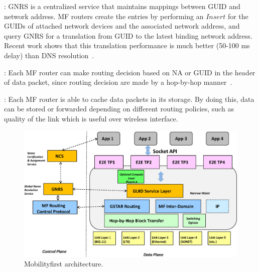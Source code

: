 \vspace{1mm}: GNRS is a centralized service that maintains mappings between GUID and network address. MF routers create the entries by performing an $Insert$ for the GUIDs of attached network devices and the associated network address, and query GNRS for a translation from GUID to the latest binding network address. Recent work shows that this translation performance is much better (50-100 ms delay) than DNS resolution~\cite{vu2012dmap}.

\vspace{1mm}: Each MF router can make routing decision based on NA or GUID in the header of data packet, since routing decision are made by a hop-by-hop manner~\cite{nelson2011gstar}.

\vspace{1mm}: Each MF router is able to cache data packets in its storage.
By doing this,  data can be stored or forwarded depending on different routing policies, such as quality of the link which is  useful over wireless interface.
\begin{figure}
\centering
\includegraphics[width=\columnwidth]{figure/mf_arch.eps}
\caption{\label{fig:mf_arch}Mobilityfirst architecture.}
\end{figure}

